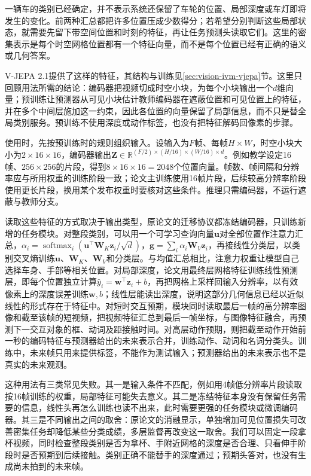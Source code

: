 一辆车的类别已经确定，并不表示系统还保留了车轮的位置、局部深度或车灯即将发生的变化。前两种汇总都把许多位置压成少数得分；若希望分别判断这些局部状态，就需要先留下带空间位置和时刻的特征，再让任务预测头读取它们。这里的密集表示是每个时空网格位置都有一个特征向量，而不是每个位置已经有正确的语义或几何答案。

V-JEPA 2.1提供了这样的特征，其结构与训练见\ref{sec:vision-ivm-vjepa}节。这里只回顾用法所需的结论：编码器把视频切成时空小块，为每个小块输出一个$d$维向量；预训练让预测器从可见小块估计教师编码器在遮蔽位置和可见位置上的特征，并在多个中间层施加这一约束，因此各位置的向量保留了局部信息，而不只是替全局类别服务。预训练不使用深度或动作标签，也没有把特征解码回像素的步骤。

使用时，先按预训练时的规则组织输入。设输入为$F$帧、每帧$H\times W$，时空小块大小为$2\times16\times16$，编码器输出$\bm{Z}\in\mathbb{R}^{(F/2)\times(H/16)\times(W/16)\times d}$。例如教学设定16帧、$256\times256$的片段，得到$8\times16\times16=2048$个位置向量。帧数、帧间隔和分辨率应与所用权重的训练阶段一致；论文主训练使用16帧片段，后续较高分辨率阶段使用更长片段，换用某个发布权重时要核对这些条件。推理只需编码器，不运行遮蔽与教师分支。

读取这些特征的方式取决于输出类型，原论文的迁移协议都冻结编码器，只训练新增的任务模块。对整段类别，可以用一个可学习查询向量$\bm{u}$对全部位置作注意力汇总，$\alpha_i=\operatorname{softmax}_i(\bm{u}^\top\bm{W}_K\bm{z}_i/\sqrt{d})$，$\bm{g}=\sum_i\alpha_i\bm{W}_V\bm{z}_i$，再接线性分类层，以类别交叉熵训练$\bm{u}$、$\bm{W}_K$、$\bm{W}_V$和分类层。与均值汇总相比，注意力权重让模型自己选择车身、手部等相关位置。对局部深度，论文用最终层网格特征训练线性预测层，即每个位置独立计算$\widehat{y}_i=\bm{w}^\top\bm{z}_i+b$，再把网格上采样回输入分辨率，以有效像素上的深度误差训练$\bm{w},b$；线性层能读出深度，说明这部分几何信息已经以近似线性的形式存在于特征中。对短时交互预期，模块同时读取最后一帧的高分辨率图像和截至该帧的短视频，把视频特征汇总到最后一帧坐标，与图像特征融合，再预测下一交互对象的框、动词及距接触时间。对高层动作预期，则把截至动作开始前一秒的编码特征与预测器给出的未来表示合并，训练动作、动词和名词分类头。训练中，未来帧只用来提供标签，不能作为测试输入；预测器给出的未来表示也不是真实的未来观测。

这种用法有三类常见失败。其一是输入条件不匹配，例如用4帧低分辨率片段读取按16帧训练的权重，局部特征可能失去意义。其二是冻结特征本身没有保留任务需要的信息，线性头再怎么训练也读不出来，此时需要更强的任务模块或微调编码器。其三是不同输出之间的取舍：原论文的消融显示，单独增加可见位置损失可改善密集任务却降低某些分类成绩，多层监督再改变这一取舍。我们可以固定一段拿杯视频，同时检查整段类别是否为拿杯、手附近网格的深度是否合理、只看伸手阶段时是否预期到后续接触。类别正确不能替手的深度通过；预期头答对，也没有生成尚未拍到的未来帧。

